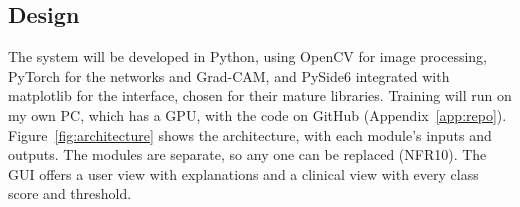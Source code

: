 \documentclass[12pt,nonacm,acmlarge,titlepage,screen]{acmart}
\begin{document}
\subsection{Design}
\label{sec:design}

The system will be developed in Python, using OpenCV \cite{bradski_opencv_2000} for image processing, PyTorch for the networks and Grad-CAM, and PySide6 integrated with matplotlib for the interface, chosen for their mature libraries. Training will run on my own PC, which has a GPU, with the code on GitHub (Appendix~\ref{app:repo}). Figure~\ref{fig:architecture} shows the architecture, with each module's inputs and outputs. The modules are separate, so any one can be replaced (NFR10). The GUI offers a user view with explanations and a clinical view with every class score and threshold.
\end{document}
